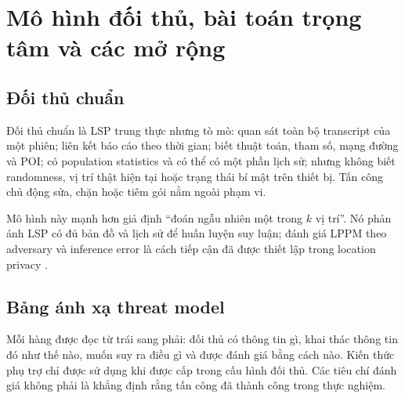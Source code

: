 \documentclass[12pt,a4paper,oneside]{report}
\begin{document}
\chapter{Mô hình đối thủ, bài toán trọng tâm và các mở rộng}
\label{ch:threat}

\section{Đối thủ chuẩn}

Đối thủ chuẩn là LSP trung thực nhưng tò mò: quan sát toàn bộ transcript của một phiên; liên kết báo cáo theo thời gian; biết thuật toán, tham số, mạng đường và POI; có population statistics và có thể có một phần lịch sử; nhưng không biết randomness, vị trí thật hiện tại hoặc trạng thái bí mật trên thiết bị. Tấn công chủ động sửa, chặn hoặc tiêm gói nằm ngoài phạm vi.

Mô hình này mạnh hơn giả định ``đoán ngẫu nhiên một trong $k$ vị trí''. Nó phản ánh LSP có đủ bản đồ và lịch sử để huấn luyện suy luận; đánh giá LPPM theo adversary và inference error là cách tiếp cận đã được thiết lập trong location privacy \citep{shokri2011quantifying}.

\section{Bảng ánh xạ threat model}

Mỗi hàng được đọc từ trái sang phải: đối thủ có thông tin gì, khai thác thông tin đó như thế nào, muốn suy ra điều gì và được đánh giá bằng cách nào. Kiến thức phụ trợ chỉ được sử dụng khi được cấp trong cấu hình đối thủ. Các tiêu chí đánh giá không phải là khẳng định rằng tấn công đã thành công trong thực nghiệm.
\end{document}
